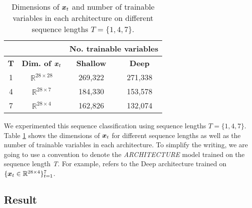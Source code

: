 \renewcommand{\arraystretch}{1.5}
\begin{table}[h]
\centering
\begin{tabular}{cc|c|c|}
\cline{3-4}
& & \multicolumn{2}{c|}{\textbf{No. trainable variables}}                                                                \\ \hline
\multicolumn{1}{|c|}{\textbf{T}}               & \multicolumn{1}{c|}{\textbf{Dim. of $\boldsymbol{x}_t$}} & \multicolumn{1}{c|}{\textbf{Shallow}} & \multicolumn{1}{c|}{\textbf{Deep}}  \\ \hline
\multicolumn{1}{|c|}{1} & $\mathbb{R}^{28 \times 28}$ & 269,322  &  271,338 \\
\multicolumn{1}{|c|}{4} & $\mathbb{R}^{28  \times  7}$ & 184,330 & 153,578 \\
\multicolumn{1}{|c|}{7} & $\mathbb{R}^{28  \times  4}$ & 162,826 & 132,074 \\ \hline

\end{tabular}
\caption{Dimensions of $\patvector{x}_t$ and number of trainable variables in each architecture on different sequence lengths $T=\{1, 4, 7\}$.}
\label{tab:seq-length}
\end{table}
\renewcommand{\arraystretch}{1}




We experimented this sequence classification using sequence lengths $T = \{1, 4, 7\}$.  Table \ref{tab:seq-length} shows the dimensions of $\patvector{x}_t$ for different sequence lengths as well as the number of trainable variables in each architecture. To simplify the writing, we are going to use a convention \textit{} to denote the \textit{ARCHITECTURE} model trained on the sequence length \textit{T}. For example,  refers to the Deep architecture trained on $\{ \boldsymbol{x}_t \in \mathbb{R}^{28 \times 4} \}_{t=1}^{7}$.

\subsection{Result}
\label{sec:exp1_result}

